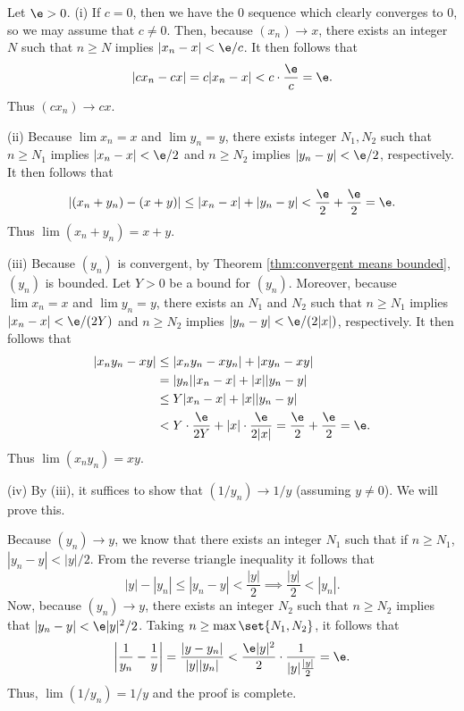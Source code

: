 \documentclass[class=article, crop=false]{standalone}
\begin{document}
\begin{pf}
    Let $\e> 0$.
    (i) If $c=0$, then we have the 0 sequence which clearly converges to 0, so we may assume that $c \neq 0$. Then, because $(x_n) \to x$, there exists an integer $N$ such that $n \geq N$ implies $|x_n-x| < \e/c$. It then follows that
        \[
            |cx_n-cx| = c|x_n-x| < c \cdot \frac{\e}{c} = \e.
        \]
    Thus $(cx_n) \to cx$.

    (ii) Because $\lim x_n = x$ and $\lim y_n = y$, there exists integer $N_1, N_2$ such that $n \geq N_1$ implies $|x_n-x| < \e/2$ and $n \geq N_2$ implies $|y_n-y| < \e/2$, respectively. It then follows that
        \[
            |(x_n+y_n) - (x+y)| \leq |x_n-x| + |y_n-y| < \frac{\e}{2} + \frac{\e}{2} = \e.
        \]
    Thus $\lim(x_n + y_n) = x+y$.

    (iii) Because $(y_n)$ is convergent, by Theorem \ref{thm:convergent means bounded}, $(y_n)$ is bounded. Let $Y > 0$ be a bound for $(y_n)$. Moreover, because $\lim x_n = x$ and $\lim y_n = y$, there exists an $N_1$ and $N_2$ such that $n\geq N_1$ implies $|x_n-x| < \e/(2Y)$ and $n \geq N_2$ implies
    $|y_n-y| < \e/(2|x|)$, respectively. It then follows that
        \begin{align*}
            |x_ny_n - xy| &\leq |x_ny_n - x y_n | + |xy_n - xy| \\
                &= |y_n| |x_n-x| + |x| |y_n-y| \\
                &\leq Y|x_n-x| + |x| |y_n-y| \\
                &< Y \cdot \frac{\e}{2Y} + |x| \cdot \frac{\e}{2|x|} = \frac{\e}{2} + \frac{\e }{2} = \e.
        \end{align*}
    Thus $\lim(x_n y_n) = xy$.

    (iv) By (iii), it suffices to show that $(1/y_n) \to 1/y$ (assuming $y \neq 0$). We will prove this.

    Because $(y_n) \to y$, we know that there exists an integer $N_1$ such that if $n \geq N_1$, $|y_n-y| < |y|/2$. From the reverse triangle inequality it follows that
        \[
            |y|-|y_n| \leq |y_n-y| < \frac{|y|}{2}\implies \frac{|y|}{2} < |y_n|.
        \]
    Now, because $(y_n) \to y$, there exists an integer $N_2$ such that $n \geq N_2$ implies that $|y_n-y| < \e |y|^2/2$. Taking $n \geq \max \set{N_1, N_2}$, it follows that
        \[
            \left| \frac{1}{y_n} - \frac{1}{y} \right| = \frac{|y-y_n|}{|y||y_n|} < \frac{\e|y|^2}{2} \cdot \frac{1}{|y| \frac{|y|}{2}} = \e.
        \]
    Thus, $\lim (1/y_n) = 1/y$ and the proof is complete.
\end{pf}
\end{document}
